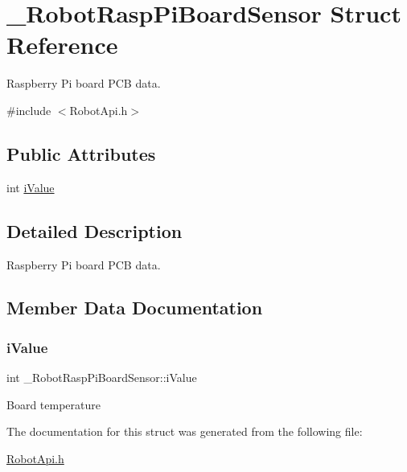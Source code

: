 \hypertarget{struct__RobotRaspPiBoardSensor}{}\section{\+\_\+\+Robot\+Rasp\+Pi\+Board\+Sensor Struct Reference}
\label{struct__RobotRaspPiBoardSensor}


Raspberry Pi board P\+CB data.  




{\ttfamily \#include $<$Robot\+Api.\+h$>$}

\subsection*{Public Attributes}
\begin{DoxyCompactItemize}
\item 
int \hyperlink{struct__RobotRaspPiBoardSensor_a6121402932f93d71f7b1140d087079cf}{i\+Value}
\end{DoxyCompactItemize}


\subsection{Detailed Description}
Raspberry Pi board P\+CB data. 

\subsection{Member Data Documentation}
\mbox{\label{struct__RobotRaspPiBoardSensor_a6121402932f93d71f7b1140d087079cf}} 
\subsubsection{\texorpdfstring{i\+Value}{iValue}}
{\footnotesize\ttfamily int \+\_\+\+Robot\+Rasp\+Pi\+Board\+Sensor\+::i\+Value}

Board temperature 

The documentation for this struct was generated from the following file\+:\begin{DoxyCompactItemize}
\item 
\hyperlink{RobotApi_8h}{Robot\+Api.\+h}\end{DoxyCompactItemize}
